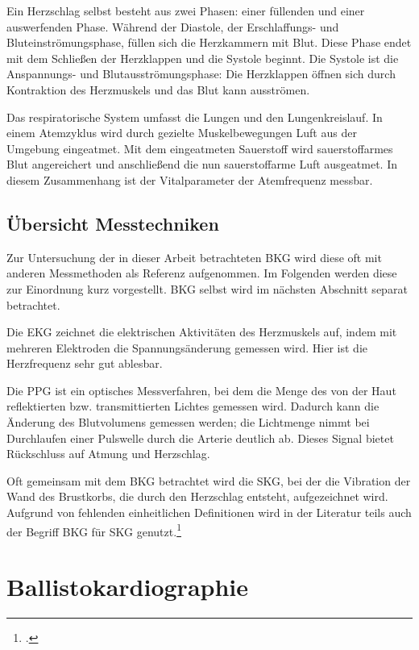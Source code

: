 	Ein Herzschlag selbst besteht aus zwei Phasen: einer füllenden und einer auswerfenden Phase. Während der Diastole, der Erschlaffungs- und Bluteinströmungsphase, füllen sich die Herzkammern mit Blut. Diese Phase endet mit dem Schließen der Herzklappen und die Systole beginnt. Die Systole ist die Anspannungs- und Blutausströmungsphase: Die Herzklappen öffnen sich durch Kontraktion des Herzmuskels und das Blut kann ausströmen.
	
	Das respiratorische System umfasst die Lungen und den Lungenkreislauf. In einem Atemzyklus wird durch gezielte Muskelbewegungen Luft aus der Umgebung eingeatmet. Mit dem eingeatmeten Sauerstoff wird sauerstoffarmes Blut angereichert und anschließend die nun sauerstoffarme Luft ausgeatmet. In diesem Zusammenhang ist der Vitalparameter der Atemfrequenz messbar.

	\subsection{Übersicht Messtechniken}
	
	Zur Untersuchung der in dieser Arbeit betrachteten \acf{BKG} wird diese oft mit anderen Messmethoden als Referenz aufgenommen. Im Folgenden werden diese zur Einordnung kurz vorgestellt. \ac{BKG} selbst wird im nächsten Abschnitt separat betrachtet.
	
	Die \acf{EKG} zeichnet die elektrischen Aktivitäten des Herzmuskels auf, indem mit mehreren Elektroden die Spannungsänderung gemessen wird. Hier ist die Herzfrequenz sehr gut ablesbar.
	
	Die \acf{PPG} ist ein optisches Messverfahren, bei dem die Menge des von der Haut reflektierten bzw. transmittierten Lichtes gemessen wird. Dadurch kann die Änderung des Blutvolumens gemessen werden; die Lichtmenge nimmt bei Durchlaufen einer Pulswelle durch die Arterie deutlich ab. Dieses Signal bietet Rückschluss auf Atmung und Herzschlag. %
	
	Oft gemeinsam mit dem \ac{BKG} betrachtet wird die \acf{SKG}, bei der die Vibration der Wand des Brustkorbs, die durch den Herzschlag entsteht, aufgezeichnet wird. Aufgrund von fehlenden einheitlichen Definitionen wird in der Literatur teils auch der Begriff \ac{BKG} für \ac{SKG} genutzt.\footcite[Vgl.][]{Inan2015}

	\section{Ballistokardiographie}\label{ballistokardiographie}
	
